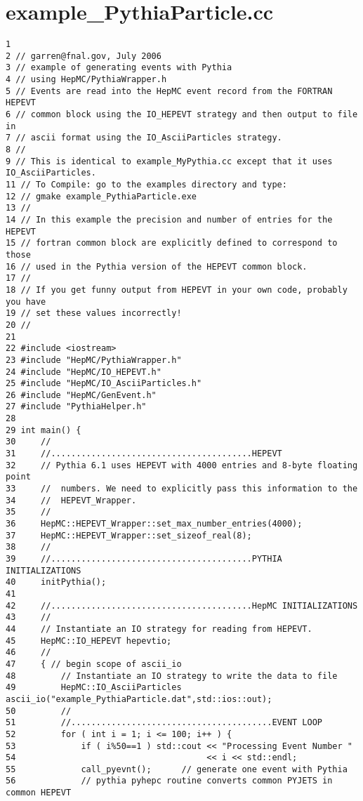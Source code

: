 \section{example\_\-Pythia\-Particle.cc}


\begin{DocInclude}\begin{verbatim}1 
2 // garren@fnal.gov, July 2006
3 // example of generating events with Pythia
4 // using HepMC/PythiaWrapper.h 
5 // Events are read into the HepMC event record from the FORTRAN HEPEVT 
6 // common block using the IO_HEPEVT strategy and then output to file in
7 // ascii format using the IO_AsciiParticles strategy.
8 //
9 // This is identical to example_MyPythia.cc except that it uses IO_AsciiParticles.
11 // To Compile: go to the examples directory and type:
12 // gmake example_PythiaParticle.exe
13 //
14 // In this example the precision and number of entries for the HEPEVT 
15 // fortran common block are explicitly defined to correspond to those 
16 // used in the Pythia version of the HEPEVT common block. 
17 //
18 // If you get funny output from HEPEVT in your own code, probably you have
19 // set these values incorrectly!
20 //
21 
22 #include <iostream>
23 #include "HepMC/PythiaWrapper.h"
24 #include "HepMC/IO_HEPEVT.h"
25 #include "HepMC/IO_AsciiParticles.h"
26 #include "HepMC/GenEvent.h"
27 #include "PythiaHelper.h"
28     
29 int main() { 
30     //
31     //........................................HEPEVT
32     // Pythia 6.1 uses HEPEVT with 4000 entries and 8-byte floating point
33     //  numbers. We need to explicitly pass this information to the 
34     //  HEPEVT_Wrapper.
35     //
36     HepMC::HEPEVT_Wrapper::set_max_number_entries(4000);
37     HepMC::HEPEVT_Wrapper::set_sizeof_real(8);
38     //
39     //........................................PYTHIA INITIALIZATIONS
40     initPythia();
41 
42     //........................................HepMC INITIALIZATIONS
43     //
44     // Instantiate an IO strategy for reading from HEPEVT.
45     HepMC::IO_HEPEVT hepevtio;
46     //
47     { // begin scope of ascii_io
48         // Instantiate an IO strategy to write the data to file 
49         HepMC::IO_AsciiParticles ascii_io("example_PythiaParticle.dat",std::ios::out);
50         //
51         //........................................EVENT LOOP
52         for ( int i = 1; i <= 100; i++ ) {
53             if ( i%50==1 ) std::cout << "Processing Event Number " 
54                                      << i << std::endl;
55             call_pyevnt();      // generate one event with Pythia
56             // pythia pyhepc routine converts common PYJETS in common HEPEVT

\end{verbatim}
\end{DocInclude}
